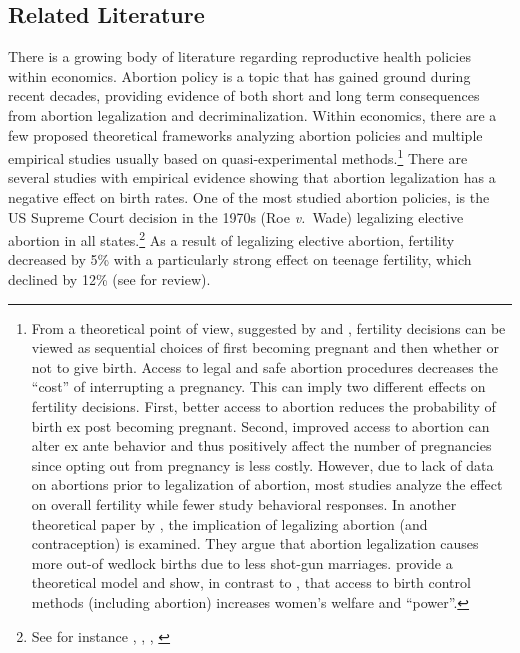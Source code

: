 \documentclass[a4paper, 11pt]{article}
\begin{document}
\begin{spacing}{2}
\subsection{Related Literature}
There is a growing body of literature regarding reproductive health policies within economics. Abortion policy is a topic that has gained ground during recent decades, providing evidence of both short and long term consequences from abortion legalization and decriminalization. Within economics, there are a few proposed theoretical frameworks analyzing abortion policies and multiple empirical studies usually based on quasi-experimental methods.\footnote{From a theoretical point of view, suggested by \cite{levine2004abortion} and \cite{ananat_abortion_2009}, fertility decisions can be viewed as sequential choices of first becoming pregnant and then whether or not to give birth. Access to legal and safe abortion procedures decreases the “cost” of interrupting a pregnancy. This can imply two different effects on fertility decisions. First, better access to abortion reduces the probability of birth ex post becoming pregnant. Second, improved access to abortion can alter ex ante behavior and thus positively affect the number of pregnancies since opting out from pregnancy is less costly. However, due to lack of data on abortions prior to legalization of abortion, most studies analyze the effect on overall fertility while fewer study behavioral responses. In another theoretical paper by \cite{akerlof1996analysis}, the implication of legalizing abortion (and contraception)  is examined. They argue that abortion legalization causes more out-of wedlock births due to less shot-gun marriages. \cite{chiappori2008birth} provide a theoretical model and show, in contrast to \cite{akerlof1996analysis}, that access to birth control methods (including abortion) increases women's welfare and ``power''.} There are several studies with empirical evidence showing that abortion legalization has a negative effect on birth rates. One of the most studied abortion policies, is the US Supreme Court decision in the 1970s (Roe \emph{v.}\ Wade) legalizing elective abortion in all states.\footnote{See for instance \cite{ananat_abortion_2009}, \cite{AngristEvans}, \cite{DonohueLevitt2001}, \cite{CharlesStephens2002}} As a result of legalizing elective abortion, fertility decreased by 5\% with a particularly strong effect on teenage fertility, which declined by 12\% (see \cite{levine2004} for review). 


\end{spacing}
\end{document}
